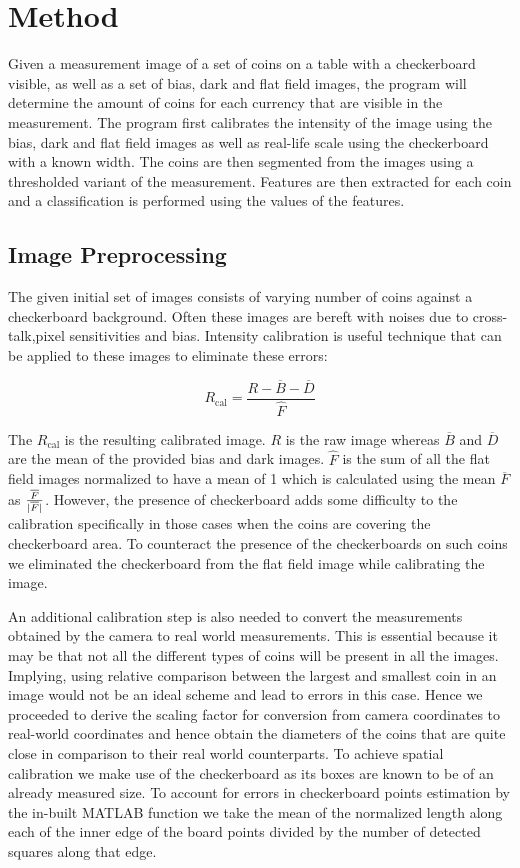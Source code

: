 \documentclass[report.tex]{subfile}
\begin{document}
\section{Method}
Given a measurement image of a set of coins on a table with a checkerboard
visible, as well as a set of bias, dark and flat field images, the program will
determine the amount of coins for each currency that are visible in the
measurement. The program first calibrates the intensity of the image using the
bias, dark and flat field images as well as real-life scale using the
checkerboard with a known width. The coins are then segmented from the images
using a thresholded variant of the measurement. Features are then extracted for
each coin and a classification is performed using the values of the features.

\subsection{Image Preprocessing}
The given initial set of images consists of varying number of coins against a
checkerboard background. Often these images are bereft with noises due to
cross-talk,pixel sensitivities and bias. Intensity calibration is useful
technique that can be applied to these images to eliminate these errors:

\begin{equation*}
    R_{\textrm{cal}} = \frac{R - \overline{B} - \overline{D}}{\hat{F}}
\end{equation*}

The $R_{\textrm{cal}}$ is the resulting calibrated image. $R$ is the raw image
whereas $\overline{B}$ and $\overline{D}$ are the mean of the provided bias and
dark images. $\hat{F}$ is the sum of all the flat field images normalized to
have a mean of 1 which is calculated using the mean $\overline{F}$ as
$\frac{\overline{F}}{\lvert\overline{F}\rvert}$. However, the presence of
checkerboard adds some difficulty to the calibration specifically in those
cases when the coins are covering the checkerboard area. To counteract the
presence of the checkerboards on such coins we eliminated the checkerboard from
the flat field image while calibrating the image.

An additional calibration step is also needed to convert the measurements
obtained by the camera to real world measurements. This is essential because it
may be that not all the different types of coins will be present in all the
images. Implying, using relative comparison between the largest and smallest
coin in an image would not be an ideal scheme and lead to errors in this case.
Hence we proceeded to derive the scaling factor for conversion from camera
coordinates to real-world coordinates and hence obtain the diameters of the
coins that are quite close in comparison to their real world counterparts. To
achieve spatial calibration we make use of the checkerboard as its boxes are
known to be of an already measured size. To account for errors in checkerboard
points estimation by the in-built MATLAB function we take the mean of the
normalized length along each of the inner edge of the board points divided by
the number of detected squares along that edge.
\end{document}
